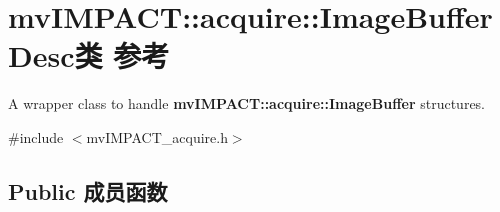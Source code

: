 \hypertarget{classmv_i_m_p_a_c_t_1_1acquire_1_1_image_buffer_desc}{\section{mv\+I\+M\+P\+A\+C\+T\+:\+:acquire\+:\+:Image\+Buffer\+Desc类 参考}
\label{classmv_i_m_p_a_c_t_1_1acquire_1_1_image_buffer_desc}
}


A wrapper class to handle {\bfseries mv\+I\+M\+P\+A\+C\+T\+::acquire\+::\+Image\+Buffer} structures.  




{\ttfamily \#include $<$mv\+I\+M\+P\+A\+C\+T\+\_\+acquire.\+h$>$}

\subsection*{Public 成员函数}
